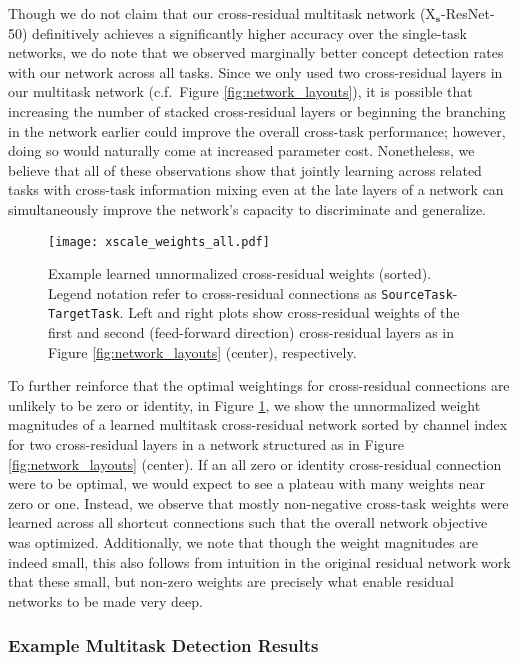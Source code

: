 \documentclass{sig-alternate-05-2015}
\newcommand{\mb}{\mathbf}
\begin{document}
Though we do not claim that our cross-residual multitask network (X$_{\mb s}$-ResNet-50) definitively achieves a significantly higher accuracy over the single-task networks, we do note that we observed marginally better concept detection rates with our network across all tasks.
Since we only used two cross-residual layers in our multitask network (c.f.~Figure \ref{fig:network_layouts}), it is possible that increasing the number of stacked cross-residual layers or beginning the branching in the network earlier could improve the overall cross-task performance; however, doing so would naturally come at increased parameter cost.
Nonetheless, we believe that all of these observations show that jointly learning across related tasks with cross-task information mixing even at the late layers of a network can simultaneously improve the network's capacity to discriminate and generalize.

\begin{figure}[t]
  \centering
  \texttt{[image: xscale\_weights\_all.pdf]}
  \caption{Example learned unnormalized cross-residual weights (sorted). Legend notation refer to cross-residual connections as \texttt{SourceTask}-\texttt{TargetTask}. Left and right plots show cross-residual weights of the first and second (feed-forward direction) cross-residual layers as in Figure \ref{fig:network_layouts} (center), respectively.} %
  \label{fig:xresidual_weights}
\end{figure}

To further reinforce that the optimal weightings for cross-residual connections are unlikely to be zero or identity, in Figure \ref{fig:xresidual_weights}, we show the unnormalized weight magnitudes of a learned multitask cross-residual network sorted by channel index for two cross-residual layers in a network structured as in Figure \ref{fig:network_layouts} (center).
If an all zero or identity cross-residual connection were to be optimal, we would expect to see a plateau with many weights near zero or one.
Instead, we observe that mostly non-negative cross-task weights were learned across all shortcut connections such that the overall network objective was optimized.
Additionally, we note that though the weight magnitudes are indeed small, this also follows from intuition in the original residual network work \cite{he_2016} that these small, but non-zero weights are precisely what enable residual networks to be made very deep.

\subsubsection{Example Multitask Detection Results}
\end{document}
